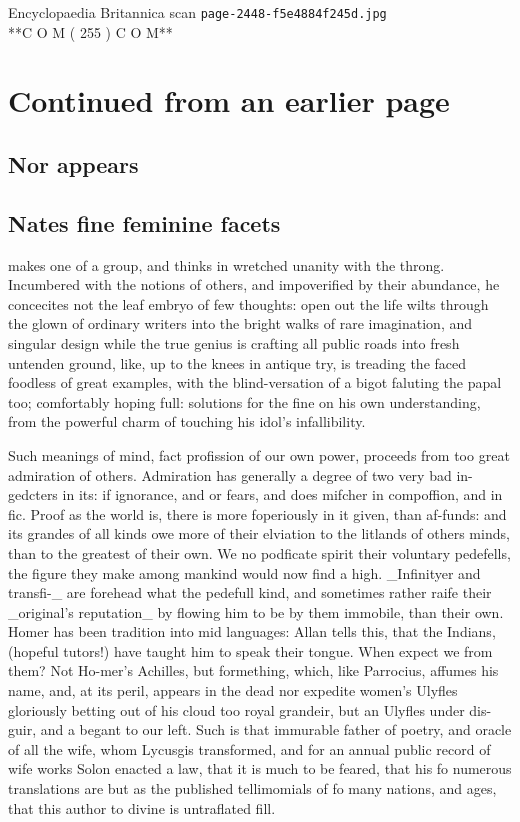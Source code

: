 \documentclass{article}
\begin{document}
\begin{center}
{\Large Encyclopaedia Britannica scan \texttt{page-2448-f5e4884f245d.jpg}}\\[0.5em]
**C O M ( 255 ) C O M**
\end{center}
\section*{Continued from an earlier page}
\subsection*{Nor appears}
\subsection*{Nates fine feminine facets}
makes one of a group, and thinks in wretched unanity with the throng. Incumbered with the notions of others, and impoverified by their abundance, he concecites not the leaf embryo of few thoughts: open out the life wilts through the glown of ordinary writers into the bright walks of rare imagination, and singular design while the true genius is crafting all public roads into fresh untenden ground, like, up to the knees in antique try, is treading the faced foodless of great examples, with the blind-versation of a bigot faluting the papal too; comfortably hoping full: solutions for the fine on his own understanding, from the powerful charm of touching his idol's infallibility.

Such meanings of mind, fact profission of our own power, proceeds from too great admiration of others. Admiration has generally a degree of two very bad in-gedcters in its: if ignorance, and or fears, and does mifcher in compoffion, and in fic. Proof as the world is, there is more foperiously in it given, than af-funds: and its grandes of all kinds owe more of their elviation to the litlands of others minds, than to the greatest of their own. We no podficate spirit their voluntary pedefells, the figure they make among mankind would now find a high. \_Infinityer and transfi-\_ are forehead what the pedefull kind, and sometimes rather raife their \_original’s reputation\_ by flowing him to be by them immobile, than their own. Homer has been tradition into mid languages: Allan tells this, that the Indians, (hopeful tutors!) have taught him to speak their tongue. When expect we from them? Not Ho-mer's Achilles, but formething, which, like Parrocius, affumes his name, and, at its peril, appears in the dead nor expedite women’s Ulyfles gloriously betting out of his cloud too royal grandeir, but an Ulyfles under dis-guir, and a begant to our left. Such is that immurable father of poetry, and oracle of all the wife, whom Lycusgis transformed, and for an annual public record of wife works Solon enacted a law, that it is much to be feared, that his fo numerous translations are but as the published tellimomials of fo many nations, and ages, that this author to divine is untraflated fill.
\end{document}

